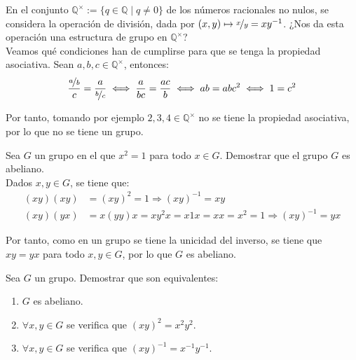 \begin{ejercicio}\label{ej:2.5}
    En el conjunto $\mathbb{Q}^{\times} := \{q \in \mathbb{Q} \mid q \neq 0\}$ de los números racionales no nulos, se considera la operación de división, dada por $(x, y) \mapsto \nicefrac{x}{y} = xy^{-1}$. ¿Nos da esta operación una estructura de grupo en $\mathbb{Q}^{\times}$?\\

    Veamos qué condiciones han de cumplirse para que se tenga la propiedad asociativa. Sean $a, b, c \in \mathbb{Q}^{\times}$, entonces:
    \begin{equation*}
        \frac{\nicefrac{a}{b}}{c} =  
        \frac{a}{\nicefrac{b}{c}}
        \iff \frac{a}{bc} = \frac{ac}{b}
        \iff ab = abc^2
        \iff 1=c^2
    \end{equation*}

    Por tanto, tomando por ejemplo $2,3,4\in\mathbb{Q}^{\times}$ no se tiene la propiedad asociativa, por lo que no se tiene un grupo.
\end{ejercicio}

\begin{ejercicio}\label{ej:2.6}
    Sea $G$ un grupo en el que $x^2 = 1$ para todo $x \in G$. Demostrar que el grupo $G$ es abeliano.\\

    Dados $x, y \in G$, se tiene que:
    \begin{align*}
        (xy)(xy) &= (xy)^2 = 1 \Longrightarrow (xy)^{-1} = xy\\
        (xy)(yx) &= x(yy)x = xy^2x = x1x = xx = x^2 = 1 \Longrightarrow (xy)^{-1} = yx
    \end{align*}

    Por tanto, como en un grupo se tiene la unicidad del inverso, se tiene que $xy = yx$ para todo $x, y \in G$, por lo que $G$ es abeliano.
\end{ejercicio}

\begin{ejercicio}\label{ej:2.7}
    Sea $G$ un grupo. Demostrar que son equivalentes:
    \begin{enumerate}
        \item $G$ es abeliano.
        \item $\forall x, y \in G$ se verifica que $(xy)^2 = x^2y^2$.
        \item $\forall x, y \in G$ se verifica que $(xy)^{-1} = x^{-1}y^{-1}$.
    \end{enumerate}
\end{ejercicio}


